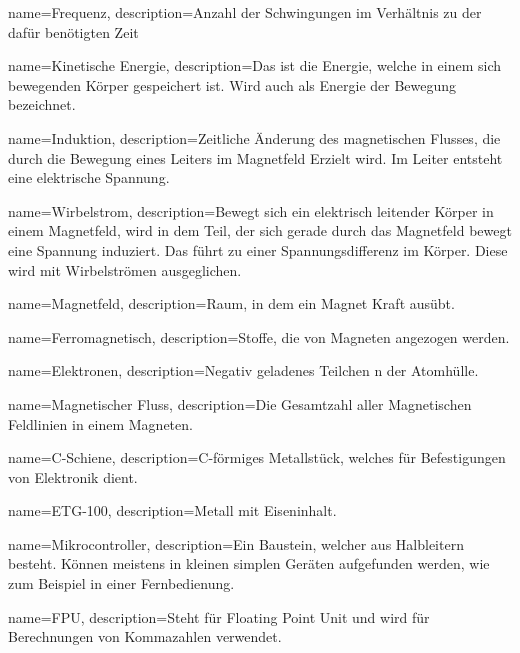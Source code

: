 {
  name={Frequenz},
  description={Anzahl der Schwingungen im Verhältnis zu der dafür benötigten Zeit}
}

{
  name={Kinetische Energie},
  description={Das ist die Energie, welche in einem sich bewegenden Körper gespeichert ist. Wird auch als Energie der Bewegung bezeichnet.}
}

{
  name={Induktion},
  description={Zeitliche Änderung des magnetischen Flusses, die durch die Bewegung eines Leiters im Magnetfeld Erzielt wird. Im Leiter entsteht eine elektrische Spannung.}
}

{
  name={Wirbelstrom},
  description={Bewegt sich ein elektrisch leitender Körper in einem Magnetfeld, wird in dem Teil, der sich gerade durch das Magnetfeld bewegt eine Spannung induziert. Das führt zu einer Spannungsdifferenz im Körper. Diese wird mit Wirbelströmen ausgeglichen.}
}

{
  name={Magnetfeld},
  description={Raum, in dem ein Magnet Kraft ausübt.}
}

{
  name={Ferromagnetisch},
  description={Stoffe, die von Magneten angezogen werden.}
}

{
  name={Elektronen},
  description={Negativ geladenes Teilchen n der Atomhülle.}
}

{
  name={Magnetischer Fluss},
  description={Die Gesamtzahl aller Magnetischen Feldlinien in einem Magneten.}
}

{
  name={C-Schiene},
  description={C-förmiges Metallstück, welches für Befestigungen von Elektronik dient.}
}

{
  name={ETG-100},
  description={Metall mit Eiseninhalt.}
}

{
  name={Mikrocontroller},
  description={Ein Baustein, welcher aus Halbleitern besteht. Können meistens in kleinen simplen Geräten aufgefunden werden, wie zum Beispiel in einer Fernbedienung.}
}

{
  name={FPU},
  description={Steht für Floating Point Unit und wird für Berechnungen von Kommazahlen verwendet.}
}